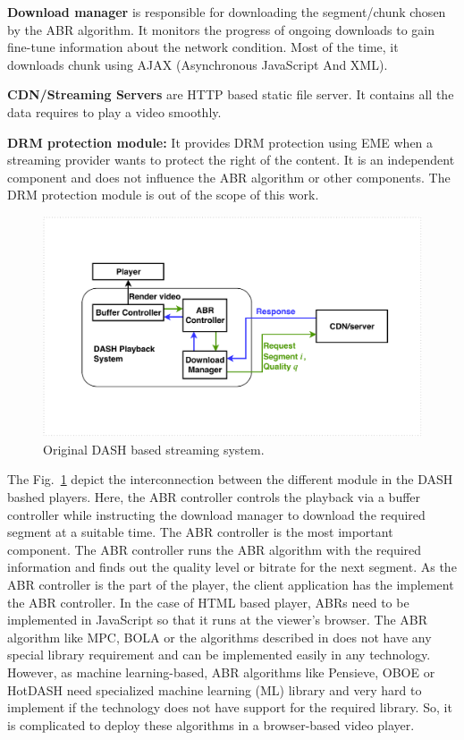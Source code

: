 {\bf Download manager} is responsible for downloading the segment/chunk chosen by the ABR algorithm. It monitors the progress of ongoing downloads to gain fine-tune information about the network condition. Most of the time, it downloads chunk using AJAX (Asynchronous JavaScript And XML).


{\bf CDN/Streaming Servers} are HTTP based static file server. It contains all the data requires to play a video smoothly.

{\bf DRM protection module:} It provides DRM protection using EME when a streaming provider wants to protect the right of the content. It is an independent component and does not influence the ABR algorithm or other components. The DRM protection module is out of the scope of this work.

\begin{figure}[ht]
	\begin{center}
		\includegraphics[width=0.7\linewidth]{img/playerDiagram_basic}
	\end{center}
	\caption{\label{fig:playerDiagram_basic} Original DASH based streaming system.}
\end{figure}

The Fig.~\ref{fig:playerDiagram_basic} depict the interconnection between the different module in the DASH bashed players. Here, the ABR controller controls the playback via a buffer controller while instructing the download manager to download the required segment at a suitable time. The ABR controller is the most important component. The ABR controller runs the ABR algorithm with the required information and finds out the quality level or bitrate for the next segment. As the ABR controller is the part of the player, the client application has the implement the ABR controller. In the case of HTML based player, ABRs need to be implemented in JavaScript so that it runs at the viewer's browser. The ABR algorithm like MPC\cite{dash:mpc}, BOLA\cite{dash:bola} or the algorithms described in \cite{dash:probe,dash:cs2p,dash:CFA,dash:rnb,dash:buffer} does not have any special library requirement and can be implemented easily in any technology. However, as machine learning-based, ABR algorithms like Pensieve\cite{dash:pensieve}, OBOE\cite{dash:oboe} or HotDASH\cite{dash:hotdash} need specialized machine learning (ML) library and very hard to implement if the technology does not have support for the required library. So, it is complicated to deploy these algorithms in a browser-based video player.

